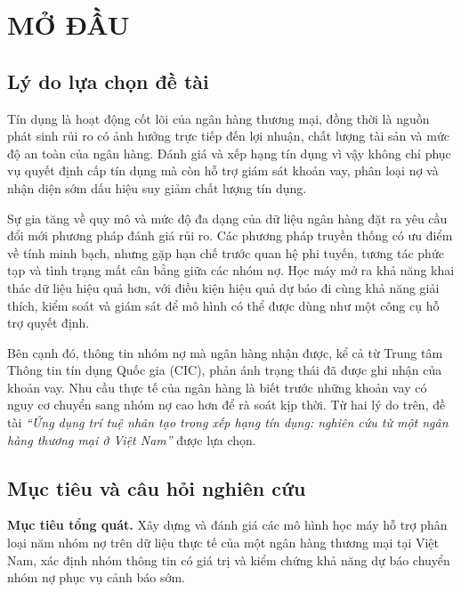\chapter*{MỞ ĐẦU}

\section*{Lý do lựa chọn đề tài}

Tín dụng là hoạt động cốt lõi của ngân hàng thương mại, đồng thời là nguồn phát sinh rủi ro có ảnh hưởng trực tiếp đến lợi nhuận, chất lượng tài sản và mức độ an toàn của ngân hàng. Đánh giá và xếp hạng tín dụng vì vậy không chỉ phục vụ quyết định cấp tín dụng mà còn hỗ trợ giám sát khoản vay, phân loại nợ và nhận diện sớm dấu hiệu suy giảm chất lượng tín dụng.

Sự gia tăng về quy mô và mức độ đa dạng của dữ liệu ngân hàng đặt ra yêu cầu đổi mới phương pháp đánh giá rủi ro. Các phương pháp truyền thống có ưu điểm về tính minh bạch, nhưng gặp hạn chế trước quan hệ phi tuyến, tương tác phức tạp và tình trạng mất cân bằng giữa các nhóm nợ. Học máy mở ra khả năng khai thác dữ liệu hiệu quả hơn, với điều kiện hiệu quả dự báo đi cùng khả năng giải thích, kiểm soát và giám sát để mô hình có thể được dùng như một công cụ hỗ trợ quyết định.

Bên cạnh đó, thông tin nhóm nợ mà ngân hàng nhận được, kể cả từ Trung tâm Thông tin tín dụng Quốc gia (CIC), phản ánh trạng thái đã được ghi nhận của khoản vay. Nhu cầu thực tế của ngân hàng là biết trước những khoản vay có nguy cơ chuyển sang nhóm nợ cao hơn để rà soát kịp thời. Từ hai lý do trên, đề tài \textit{``Ứng dụng trí tuệ nhân tạo trong xếp hạng tín dụng: nghiên cứu từ một ngân hàng thương mại ở Việt Nam''} được lựa chọn.

\section*{Mục tiêu và câu hỏi nghiên cứu}

\noindent\textbf{Mục tiêu tổng quát.} Xây dựng và đánh giá các mô hình học máy hỗ trợ phân loại năm nhóm nợ trên dữ liệu thực tế của một ngân hàng thương mại tại Việt Nam, xác định nhóm thông tin có giá trị và kiểm chứng khả năng dự báo chuyển nhóm nợ phục vụ cảnh báo sớm.

